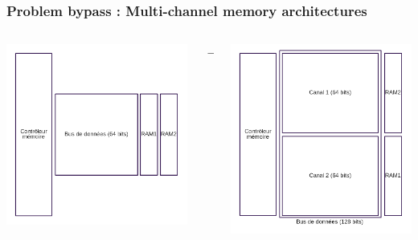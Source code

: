 \begin{frame}
\frametitle{Problem bypass : Multi-channel memory architectures}

\begin{columns}[c] %
\begin{column}{.33\textwidth}
\centering \includegraphics[scale=.4]{images/mono-canal.png}
\end{column}%
\begin{column}{.01\textwidth}
$\longrightarrow$
\end{column}
\begin{column}{.28\textwidth}
\centering \includegraphics[scale=.4]{images/multi-canal.png}
\end{column}%
\end{columns}


\end{frame}
